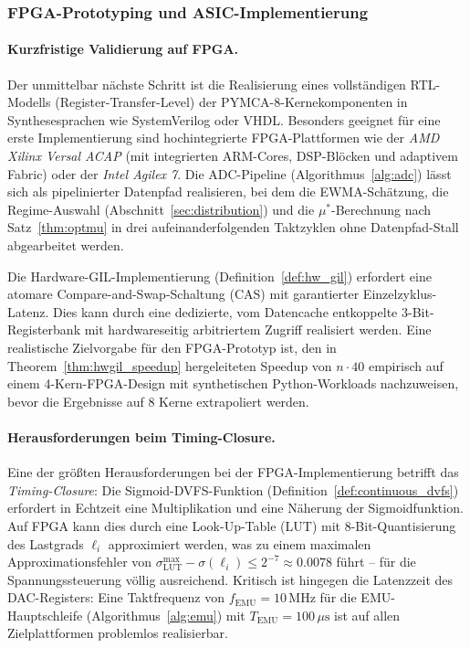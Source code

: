 ﻿\documentclass[a4paper,12pt]{scrreprt}
\theoremstyle{definition}
\begin{document}
	\subsubsection{FPGA-Prototyping und ASIC-Implementierung}

	\paragraph{Kurzfristige Validierung auf FPGA.}
	Der unmittelbar nächste Schritt ist die Realisierung eines vollständigen
	RTL-Modells (Register-Transfer-Level) der PYMCA-8-Kernekom\-ponenten in
	Synthesesprachen wie SystemVerilog oder VHDL. Besonders geeignet für eine
	erste Implementierung sind hochintegrierte FPGA-Plattformen wie der
	\emph{AMD Xilinx Versal ACAP} (mit integrierten ARM-Cores, DSP-Blöcken und
	adaptivem Fabric) oder der \emph{Intel Agilex 7}. Die ADC-Pipeline
	(Algorithmus~\ref{alg:adc}) lässt sich als pipelinierter Datenpfad realisieren,
	bei dem die EWMA-Schätzung, die Regime-Auswahl (Abschnitt~\ref{sec:distribution})
	und die $\mu^*$-Berechnung nach Satz~\ref{thm:optmu} in drei aufeinanderfolgenden
	Taktzyklen ohne Datenpfad-Stall abgearbeitet werden.

	Die Hardware-GIL-Implementierung (Definition~\ref{def:hw_gil}) erfordert eine
	atomare Compare-and-Swap-Schaltung (CAS) mit garantierter Einzelzyklus-Latenz.
	Dies kann durch eine dedizierte, vom Datencache entkoppelte 3-Bit-Registerbank
	mit hardwareseitig arbitriertem Zugriff realisiert werden. Eine realistische
	Zielvorgabe für den FPGA-Prototyp ist, den in Theorem~\ref{thm:hwgil_speedup}
	hergeleiteten Speedup von $n \cdot 40$ empirisch auf einem 4-Kern-FPGA-Design
	mit synthetischen Python-Workloads nachzuweisen, bevor die Ergebnisse auf
	8 Kerne extrapoliert werden.

	\paragraph{Herausforderungen beim Timing-Closure.}
	Eine der größten Herausforderungen bei der FPGA-Implementierung betrifft das
	\emph{Timing-Closure}: Die Sigmoid-DVFS-Funktion (Definition~\ref{def:continuous_dvfs})
	erfordert in Echtzeit eine Multiplikation und eine Näherung der Sigmoidfunktion.
	Auf FPGA kann dies durch eine Look-Up-Table (LUT) mit 8-Bit-Quantisierung des
	Lastgrads $\ell_i$ approximiert werden, was zu einem maximalen Approximationsfehler
	von $\sigma_{\mathrm{LUT}}^{\max} - \sigma(\ell_i) \le 2^{-7} \approx 0.0078$ führt
	-- für die Spannungssteuerung völlig ausreichend. Kritisch ist hingegen die
	Latenzzeit des DAC-Registers: Eine Taktfrequenz von $f_{\mathrm{EMU}} = 10\,\mathrm{MHz}$
	für die EMU-Hauptschleife (Algorithmus~\ref{alg:emu}) mit $T_{\mathrm{EMU}} = 100\,\mu\mathrm{s}$
	ist auf allen Zielplattformen problemlos realisierbar.
\end{document}
